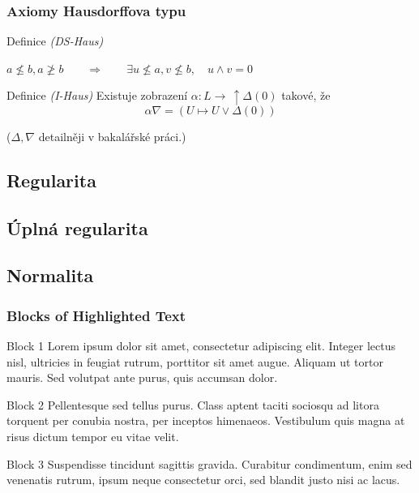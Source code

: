 \documentclass[mathserif]{beamer}
\begin{document}
\begin{frame}
\frametitle{Axiomy Hausdorffova typu}

\begin{block}{Definice \textit{(DS-Haus)}}
  \begin{center}
    $a \not\le b, a \not\ge b \qquad \Rightarrow \qquad \exists u\not\leq a,
    v\not\leq b, \quad u \wedge v = 0$
  \end{center}
\end{block}
\pause

\newcommand{\dL}{\, \uparrow \Delta(0)}
\begin{block}{Definice \textit{(I-Haus)}}
  Existuje zobrazení $\alpha\colon L \to \dL$ takové, že
  \[
    \alpha \nabla = (U \mapsto U \vee \Delta(0))
  \]
\end{block}
($\Delta, \nabla$ detailněji v bakalářské práci.)
\pause

\end{frame}


\subsection{Regularita}

\subsection{Úplná regularita}

\subsection{Normalita}

\begin{frame}
\frametitle{Blocks of Highlighted Text}
\begin{block}{Block 1}
Lorem ipsum dolor sit amet, consectetur adipiscing elit. Integer lectus nisl, ultricies in feugiat rutrum, porttitor sit amet augue. Aliquam ut tortor mauris. Sed volutpat ante purus, quis accumsan dolor.
\end{block}

\begin{block}{Block 2}
Pellentesque sed tellus purus. Class aptent taciti sociosqu ad litora torquent per conubia nostra, per inceptos himenaeos. Vestibulum quis magna at risus dictum tempor eu vitae velit.
\end{block}

\begin{block}{Block 3}
Suspendisse tincidunt sagittis gravida. Curabitur condimentum, enim sed venenatis rutrum, ipsum neque consectetur orci, sed blandit justo nisi ac lacus.
\end{block}
\end{frame}
\end{document}

